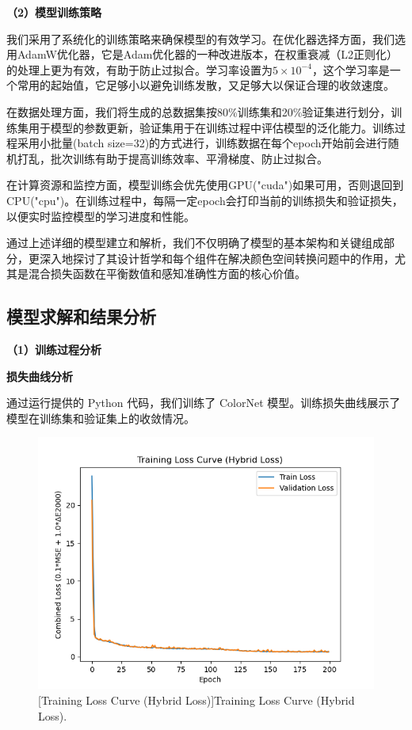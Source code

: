 \noindent\textbf{（2）模型训练策略}

我们采用了系统化的训练策略来确保模型的有效学习。在优化器选择方面，我们选用AdamW优化器，它是Adam优化器的一种改进版本，在权重衰减（L2正则化）的处理上更为有效，有助于防止过拟合。学习率设置为$5 \times 10^{-4}$，这个学习率是一个常用的起始值，它足够小以避免训练发散，又足够大以保证合理的收敛速度。

在数据处理方面，我们将生成的总数据集按80\%训练集和20\%验证集进行划分，训练集用于模型的参数更新，验证集用于在训练过程中评估模型的泛化能力。训练过程采用小批量(batch size=32)的方式进行，训练数据在每个epoch开始前会进行随机打乱，批次训练有助于提高训练效率、平滑梯度、防止过拟合。

在计算资源和监控方面，模型训练会优先使用GPU("cuda")如果可用，否则退回到CPU("cpu")。在训练过程中，每隔一定epoch会打印当前的训练损失和验证损失，以便实时监控模型的学习进度和性能。

通过上述详细的模型建立和解析，我们不仅明确了模型的基本架构和关键组成部分，更深入地探讨了其设计哲学和每个组件在解决颜色空间转换问题中的作用，尤其是混合损失函数在平衡数值和感知准确性方面的核心价值。

\subsection[\hspace{-2pt}模型求解和结果分析]{{\heiti{} \hspace{-8pt}模型求解和结果分析}}\label{section2: 模型求解和结果分析}

\noindent\textbf{（1）训练过程分析}

 \textbf{损失曲线分析}

通过运行提供的 Python 代码，我们训练了 ColorNet 模型。训练损失曲线展示了模型在训练集和验证集上的收敛情况。

\begin{figure}[H]
\centering
{}
\includegraphics[width=0.8\columnwidth]{figures/Training_Loss_Curve.png}
[Training Loss Curve (Hybrid Loss)]{Training Loss Curve (Hybrid Loss).}
\label{figure2: loss_curve}
\end{figure}

